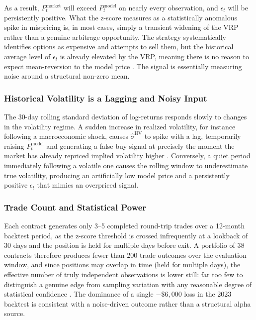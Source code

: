 \documentclass[10pt,twocolumn]{article}
\begin{document}
As a result, $P_t^{\text{market}}$ will exceed $P_t^{\text{model}}$ on
nearly every observation, and $\epsilon_t$ will be persistently positive.
What the z-score measures as a statistically anomalous spike in mispricing
is, in most cases, simply a transient widening of the VRP rather than a
genuine arbitrage opportunity. The strategy systematically identifies options
as expensive and attempts to sell them, but the historical average level of
$\epsilon_t$ is already elevated by the VRP, meaning there is no reason to
expect mean-reversion to the model price \cite{stein1989}. The signal is
essentially measuring noise around a structural non-zero mean.

\subsubsection{Historical Volatility is a Lagging and Noisy Input}

The 30-day rolling standard deviation of log-returns responds slowly to
changes in the volatility regime. A sudden increase in realized volatility,
for instance following a macroeconomic shock, causes
$\hat{\sigma}^{\text{HV}}$ to spike with a lag, temporarily raising
$P_t^{\text{model}}$ and generating a false buy signal at precisely the
moment the market has already repriced implied volatility higher
\cite{andersen2003}. Conversely, a quiet period immediately following a
volatile one causes the rolling window to underestimate true volatility,
producing an artificially low model price and a persistently positive
$\epsilon_t$ that mimics an overpriced signal.

\subsubsection{Trade Count and Statistical Power}

Each contract generates only 3--5 completed round-trip trades over a
12-month backtest period, as the z-score threshold is crossed infrequently
at a lookback of 30 days and the position is held for multiple days
before exit. A portfolio of 38 contracts therefore produces fewer than
200 trade outcomes over the evaluation window, and since positions may
overlap in time (held for multiple days), the effective number of truly
independent observations is lower still: far too few to distinguish a
genuine edge from sampling variation with any reasonable degree of
statistical confidence \cite{bailey2014}. The dominance of a single $-\$6{,}000$ loss in the 2023
backtest is consistent with a noise-driven outcome rather than a structural
alpha source.
\end{document}
